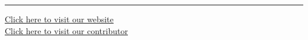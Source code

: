 \documentclass[11pt,a4paper]{article}
\begin{document}
\vfill
\rule{\linewidth}{0.4pt}

\begin{center}\small
\href{https://bhu-exam.vercel.app/}{Click here to visit our website}\\[4pt]
\href{https://me-aryan.vercel.app/}{Click here to visit our contributor}
\end{center}
\end{document}
